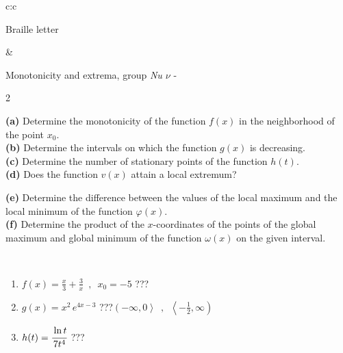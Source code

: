 \documentclass[10pt]{report}
\begin{document}
\begin{tabular}{c:c}
\begin{minipage}[c][104.5mm][t]{0.5\linewidth}
\begin{center}
\begin{minipage}{0.20\linewidth}
\begin{center}
{\small Braille letter}
\end{center}
\end{minipage}
\end{center}
\end{minipage}
&
\begin{minipage}[c][104.5mm][t]{0.5\linewidth}
\begin{center}
\vspace{5mm}
{\huge Monotonicity and extrema, group \textit{Nu $\nu$} -}\\[5mm]
\begin{minipage}{0.95\linewidth}
\begin{center}
{\small \begin{multicols}{2} \raggedright
\textbf{(a)} Determine the monotonicity of the function \(f(x)\) in the neighborhood of the point \(x_0\). \\[1mm]
\textbf{(b)} Determine the intervals on which the function \(g(x)\) is decreasing. \\[1mm]
\textbf{(c)} Determine the number of stationary points of the function \(h(t)\). \\[1mm]
\textbf{(d)} Does the function \(v(x)\) attain a local extremum? \par \columnbreak
\textbf{(e)} Determine the difference between the values of the local maximum and the local minimum of the function \(\varphi(x)\). \\[1mm]
\textbf{(f)} Determine the product of the \(x\)-coordinates of the points of the global maximum and global minimum of the function \(\omega(x)\) on the given interval. \\[1mm]
\end{multicols}
}
\end{center}
\end{minipage}
\\[1mm]
\begin{minipage}{0.79\linewidth}
\begin{center}
\begin{varwidth}{\linewidth}
\setlength{\itemsep}{0pt}
\begin{enumerate}
\normalsize
\item $f(x)=\frac{x}{3}+\frac{3}{x} \enspace , \enspace x_0=-5$\quad \dotfill\; ???\;\dotfill \quad {}
\item $g(x)=x^2\, e^{4x-3}$\quad \dotfill\; ???\;\dotfill \quad $\left(-\infty , 0\right\rangle\enspace , \enspace \left\langle-\frac{1}{2} , \infty\right)$
\item $h(t)=\cfrac{\ln t}{7t^4}$\quad \dotfill\; ???\;\dotfill {}

\end{enumerate}
\end{varwidth}
\end{center}
\end{minipage}
\end{center}
\end{minipage}
\end{tabular}
\end{document}
